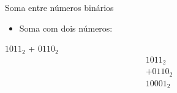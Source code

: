 
\begin{frame}{Soma entre números binários}
    \begin{itemize}
        \item Soma com dois números:
    \end{itemize}
    $1011_{2}$ + $0110_{2}$ \\[0.2cm]
    \[ \begin{array}{r} 1011_{2} \\ + 0110_{2} \\ \hline 10001_{2} \end{array} \]
\end{frame}